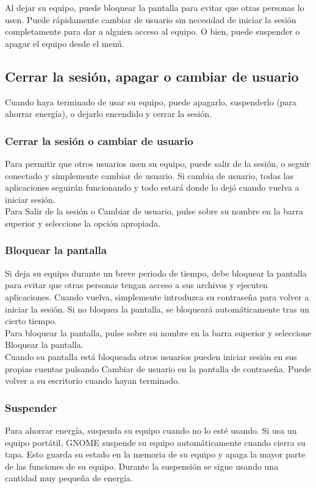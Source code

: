 Al dejar su equipo, puede bloquear la pantalla para evitar que otras personas lo usen. Puede rápidamente cambiar de usuario sin necesidad de iniciar la sesión completamente para dar a alguien acceso al equipo. O bien, puede suspender o apagar el equipo desde el menú.
\subsection{Cerrar la sesión, apagar o cambiar de usuario}
Cuando haya terminado de usar su equipo, puede apagarlo, suspenderlo (para ahorrar energía), o dejarlo encendido y cerrar la sesión.
\subsubsection{Cerrar la sesión o cambiar de usuario}
Para permitir que otros usuarios usen su equipo, puede salir de la sesión, o seguir conectado y simplemente cambiar de usuario. Si cambia de usuario, todas las aplicaciones seguirán funcionando y todo estará donde lo dejó cuando vuelva a iniciar sesión.\\
Para Salir de la sesión o Cambiar de usuario, pulse sobre su nombre en la barra superior y seleccione la opción apropiada.
\subsubsection{Bloquear la pantalla}
Si deja su equipo durante un breve periodo de tiempo, debe bloquear la pantalla para evitar que otras personas tengan acceso a sus archivos y ejecuten aplicaciones. Cuando vuelva, simplemente introduzca su contraseña para volver a iniciar la sesión. Si no bloquea la pantalla, se bloqueará automáticamente tras un cierto tiempo.\\

Para bloquear la pantalla, pulse sobre su nombre en la barra superior y seleccione Bloquear la pantalla.\\

Cuando su pantalla está bloqueada otros usuarios pueden iniciar sesión en sus propias cuentas pulsando Cambiar de usuario en la pantalla de contraseña. Puede volver a su escritorio cuando hayan terminado.
\subsubsection{Suspender}
Para ahorrar energía, suspenda su equipo cuando no lo esté usando. Si usa un equipo portátil, GNOME suspende su equipo automáticamente cuando cierra su tapa. Esto guarda su estado en la memoria de su equipo y apaga la mayor parte de las funciones de su equipo. Durante la suspensión se sigue usando una cantidad muy pequeña de energía.\\

